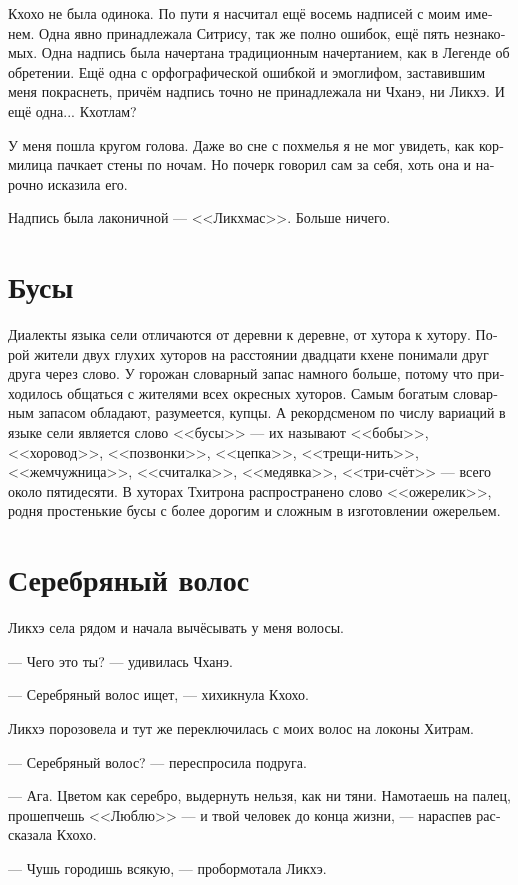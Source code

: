 \documentclass[a4paper,12pt,fleqn]{book}\usepackage{cooltooltips}\usepackage{polyglossia}\setdefaultlanguage[babelshorthands=true]{russian}\setotherlanguage{english}\defaultfontfeatures{Ligatures=TeX,Mapping=tex-text} \usepackage{xcolor}\definecolor{lightgray}{HTML}{bbbbbb}\color{lightgray}\newcommand{\ml}[3]{\textenglish{\textcolor{black}{#3}}}
\begin{document}
{Кхохо не была одинока.
По пути я насчитал ещё восемь надписей с моим именем.
Одна явно принадлежала Ситрису, так же полно ошибок, ещё пять незнакомых.
Одна надпись была начертана традиционным начертанием, как в Легенде об обретении.
Ещё одна с орфографической ошибкой и эмоглифом, заставившим меня покраснеть, причём надпись точно не принадлежала ни Чханэ, ни Ликхэ.
И ещё одна... Кхотлам?

У меня пошла кругом голова.
Даже во сне с похмелья я не мог увидеть, как кормилица пачкает стены по ночам.
Но почерк говорил сам за себя, хоть она и нарочно исказила его.

Надпись была лаконичной --- <<Ликхмас>>.
Больше ничего.

\section{Бусы}

Диалекты языка сели отличаются от деревни к деревне, от хутора к хутору.
Порой жители двух глухих хуторов на расстоянии двадцати кхене понимали друг друга через слово.
У горожан словарный запас намного больше, потому что приходилось общаться с жителями всех окресных хуторов.
Самым богатым словарным запасом обладают, разумеется, купцы.
А рекордсменом по числу вариаций в языке сели является слово <<бусы>> --- их называют <<бобы>>, <<хоровод>>, <<позвонки>>, <<цепка>>, <<трещи-нить>>, <<жемчужница>>, <<считалка>>, <<медявка>>, <<три-счёт>> --- всего около пятидесяти.
В хуторах Тхитрона распространено слово <<ожерелик>>, родня простенькие бусы с более дорогим и сложным в изготовлении ожерельем.

\section{Серебряный волос}

Ликхэ села рядом и начала вычёсывать у меня волосы.

--- Чего это ты? --- удивилась Чханэ.

--- Серебряный волос ищет, --- хихикнула Кхохо.

Ликхэ порозовела и тут же переключилась с моих волос на локоны Хитрам.

--- Серебряный волос? --- переспросила подруга.

--- Ага.
Цветом как серебро, выдернуть нельзя, как ни тяни.
Намотаешь на палец, прошепчешь <<Люблю>> --- и твой человек до конца жизни, --- нараспев рассказала Кхохо.

--- Чушь городишь всякую, --- пробормотала Ликхэ.

}
\end{document}
